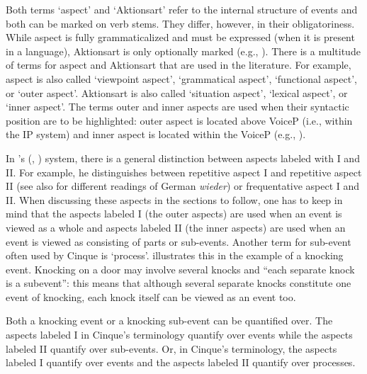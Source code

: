 Both terms `aspect' and `Aktionsart' refer to the internal structure of events and both can be marked on verb stems. They differ, however, in their obligatoriness. While aspect is fully grammaticalized and must be expressed (when it is present in a language), Aktionsart is only optionally marked (e.g., \citealt[170]{binnick1991time}). There is a multitude of terms for aspect and Aktionsart that are used in the literature. For example, aspect is also called `viewpoint aspect', `grammatical aspect', `functional aspect', or `outer aspect'. Aktionsart is also called `situation aspect', `lexical aspect', or `inner aspect'. The terms outer and inner aspects are used when their syntactic position are to be highlighted: outer aspect is located above VoiceP (i.e., within the IP system) and inner aspect is located within the VoiceP (e.g., \citealt{macdonald2008syntactic, travis2010aspect}).

In \citeauthor{cinque1999adverbs}'s (\citeyear{cinque1999adverbs}, \citeyear{cinque2006restructuring}) system, there is a general distinction between aspects labeled with I and II. For example, he distinguishes between repetitive aspect I and repetitive aspect II (see also \citealt{stechow1996different} for different readings of German \textit{wieder}) or frequentative aspect I and II. When discussing these aspects in the sections to follow, one has to keep in mind that the aspects labeled I (the outer aspects) are used when an event is viewed as a whole and aspects labeled II (the inner aspects) are used when an event is viewed as consisting of parts or sub-events. Another term for sub-event often used by Cinque is `process'. \citet[189]{binnick1991time} illustrates this in the example of a knocking event. Knocking on a door may involve several knocks and ``each separate knock is a subevent'': this means that although several separate knocks constitute one event of knocking, each knock itself can be viewed as an event too. 

Both a knocking event or a knocking sub-event can be quantified over. The aspects labeled I in Cinque's terminology quantify over events while the aspects labeled II quantify over sub-events. Or, in Cinque's terminology, the aspects labeled I quantify over events and the aspects labeled II quantify over processes.

